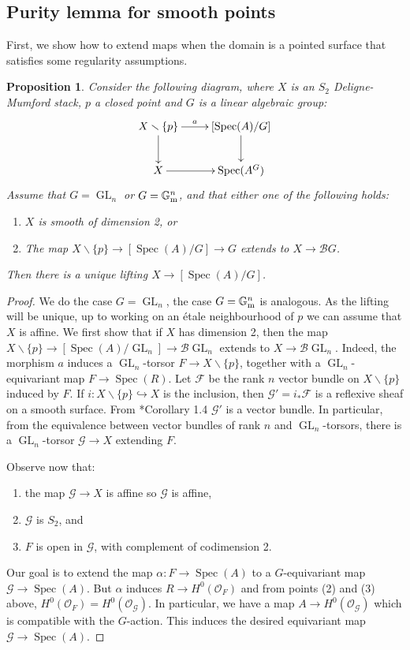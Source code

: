 \documentclass{amsart}
\newcommand{\bG}{\mathbb{G}}
\newcommand{\cB}{\mathcal{B}}
\newcommand{\cF}{\mathcal{F}}
\newcommand{\cG}{\mathcal{G}}
\newcommand{\cO}{\mathcal{O}}
\newcommand{\spec}{\operatorname{Spec}}
\newcommand{\Gm}{\bG_{{\rm m}}}
\newcommand{\GL}{\operatorname{GL}}
\newtheorem{Prop}[theorem]{Proposition}
\theoremstyle{definition}
\begin{document}
\subsection{Purity lemma for smooth points}
First, we show how to extend maps when the domain is a pointed surface that satisfies some regularity assumptions.
\begin{Prop}\label{prop smooth purity}
Consider the following diagram, where $X$ is an $S_2$ Deligne-Mumford stack, $p$ a closed point and $G$ is a linear algebraic group:
$$\xymatrix{X\smallsetminus \{p\}\ar[d] \ar[r]^-a &[\spec(A)/G]\ar[d] \\ X \ar[r] & \spec(A^{G})}$$
Assume that $G=\GL_n$ or $G=\Gm^n$, and that either one of the following holds:
\begin{enumerate}
    \item $X$ is smooth of dimension 2, or
    \item The map $X\smallsetminus \{p\}\to [\spec(A)/G]\to G$
 extends to $X\to \cB G$.\end{enumerate}
Then there is a unique lifting $X\to [\spec(A)/G]$.
\end{Prop}
\begin{proof}We do the case $G=\GL_n$, the case $G=\Gm^n$ is analogous.
As the lifting will be unique, up to working on an \'etale neighbourhood of $p$ we can assume that $X$ is affine.
We first show that if $X$ has dimension 2, then the map $X\smallsetminus \{p\}\to [\spec(A)/\GL_n]\to \cB\GL_n$
 extends to $X\to \cB\GL_n$. Indeed, the morphism $a$ induces a $\GL_n$-torsor $F\to X\smallsetminus \{p\}$, together with a $\GL_n$-equivariant map $F\to \spec(R)$. Let $\cF$ be the rank $n$ vector bundle on $X\smallsetminus \{p\}$ induced by $F$. If $i:X\smallsetminus \{p\}\hookrightarrow X$ is the inclusion, then $\cG' = i_*\cF$ is a reflexive sheaf on a smooth surface. From \cite{Har80}*{Corollary 1.4} $\cG'$ is a vector bundle. In particular, from the equivalence between vector bundles of rank $n$ and $\GL_n$-torsors, there is a $\GL_n$-torsor $\cG\to X$ extending $F$.

Observe now that:
\begin{enumerate}
    \item the map $\cG\to X$ is affine so $\cG$ is affine,
    \item $\cG$ is $S_2$, and
    \item $F$ is open in $\cG$, with complement of codimension 2.
\end{enumerate}
Our goal is to extend the map $\alpha: F\to \spec(A)$ to a $G$-equivariant map $\cG\to \spec(A)$. But $\alpha$ induces $R\to H^0(\cO_F)$ and from points (2) and (3) above, $H^0(\cO_F) = H^0(\cO_\cG)$. In particular, we have a map $A\to H^0(\cO_\cG)$ which is compatible with the $G$-action. This induces the desired equivariant map $\cG\to \spec(A)$.
\end{proof}
\end{document}
